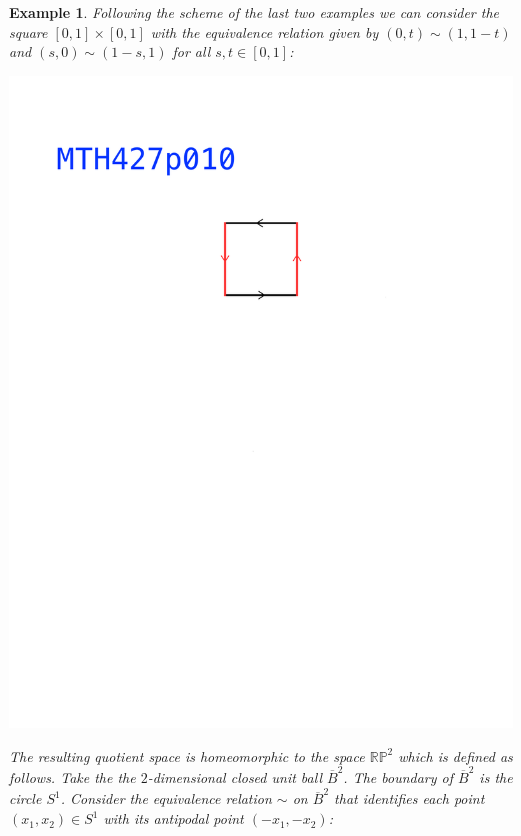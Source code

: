 \documentclass[11pt, letterpaper, oneside]{report}
\theoremstyle{pplain}
\newtheorem{ITERMVALUE THM}[theorem]{Intermediate Value Theorem}
\newtheorem{HEINEBOREL THM}[theorem]{Heine-Borel Theorem}
\newtheorem{UMETR THM}[theorem]{Urysohn Metrization Theorem}
\newtheorem{UMETR2 THM}[theorem]{Urysohn Metrization Theorem (v.2)}
\theoremstyle{ddefinition}
\newtheorem{example}[theorem]{Example}
\theoremstyle{nnn}
\newtheorem{TDA NN}[theorem]{Topological Data Analysis. }
\theoremstyle{eexercise}
\newcommand{\RP}{{\mathbb R\mathbb P}}
\begin{document}
\begin{example}
\label{RP2 EXAMPLE}
Following the scheme of the last two examples we can consider the square
$[0,1]\times [0,1]$ with the equivalence relation given by $(0,t)\sim (1, 1-t)$
 and $(s, 0)\sim (1-s,1)$ for all $s, t\in [0,1]$:

{{\includegraphics[width=\textwidth, trim=0mm 183mm 0mm 60mm, clip]{pictures/MTH427p010.pdf}}}   

The resulting quotient space is homeomorphic to the space $\RP^{2}$
which is defined as follows. Take the the $2$-dimensional closed unit ball $\overline{B}^{2}$. 
The boundary of $\overline{B}^{2}$ is the circle $S^{1}$. Consider the equivalence relation $\sim$ 
on $\overline{B}^{2}$ that identifies each point $(x_{1}, x_{2})\in S^{1}$ with its antipodal point 
$(-x_{1}, -x_{2})$:


\end{example}
\end{document}
